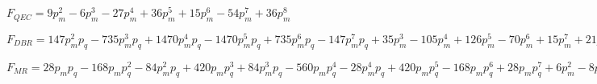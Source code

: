 $F_{QEC} = 9p_{m}^{2} - 6p_{m}^{3} - 27p_{m}^{4} + 36p_{m}^{5} + 15p_{m}^{6} - 54p_{m}^{7} + 36p_{m}^{8}$

$F_{DBR} = 147p_{m}^{2}p_{q} - 735p_{m}^{3}p_{q} + 1470p_{m}^{4}p_{q} - 1470p_{m}^{5}p_{q} + 735p_{m}^{6}p_{q} - 147p_{m}^{7}p_{q} + 35p_{m}^{3} - 105p_{m}^{4} + 126p_{m}^{5} - 70p_{m}^{6} + 15p_{m}^{7} + 21p_{q}^{2} - 70p_{q}^{3} + 105p_{q}^{4} - 84p_{q}^{5} + 35p_{q}^{6} - 6p_{q}^{7} - 882p_{m}^{2}p_{q}^{2} + 2205p_{m}^{2}p_{q}^{3} + 3675p_{m}^{3}p_{q}^{2} - 2940p_{m}^{2}p_{q}^{4} - 8575p_{m}^{3}p_{q}^{3} - 6615p_{m}^{4}p_{q}^{2} + 2205p_{m}^{2}p_{q}^{5} + 11025p_{m}^{3}p_{q}^{4} + 14700p_{m}^{4}p_{q}^{3} + 6174p_{m}^{5}p_{q}^{2} - 882p_{m}^{2}p_{q}^{6} - 8085p_{m}^{3}p_{q}^{5} - 18375p_{m}^{4}p_{q}^{4} - 13230p_{m}^{5}p_{q}^{3} - 2940p_{m}^{6}p_{q}^{2} + 147p_{m}^{2}p_{q}^{7}  3185p_{m}^{3}p_{q}^{6} + 13230p_{m}^{4}p_{q}^{5}  16170p_{m}^{5}p_{q}^{4} + 6125p_{m}^{6}p_{q}^{3}  567p_{m}^{7}p_{q}^{2} - 525p_{m}^{3}p_{q}^{7}  5145p_{m}^{4}p_{q}^{6}  11466p_{m}^{5}p_{q}^{5}$

$F_{MR} = 28p_{m}p_{q} - 168p_{m}p_{q}^{2} - 84p_{m}^{2}p_{q} + 420p_{m}p_{q}^{3} + 84p_{m}^{3}p_{q} - 560p_{m}p_{q}^{4} - 28p_{m}^{4}p_{q} + 420p_{m}p_{q}^{5} - 168p_{m}p_{q}^{6} + 28p_{m}p_{q}^{7} + 6p_{m}^{2} - 8p_{m}^{3} + 3p_{m}^{4} + 21p_{q}^{2} - 70p_{q}^{3} + 105p_{q}^{4} - 84p_{q}^{5} + 35p_{q}^{6} - 6p_{q}^{7} + 378p_{m}^{2}p_{q}^{2} - 840p_{m}^{2}p_{q}^{3} - 336p_{m}^{3}p_{q}^{2} + 1050p_{m}^{2}p_{q}^{4} + 700p_{m}^{3}p_{q}^{3} + 105p_{m}^{4}p_{q}^{2} - 756p_{m}^{2}p_{q}^{5} - 840p_{m}^{3}p_{q}^{4} - 210p_{m}^{4}p_{q}^{3} + 294p_{m}^{2}p_{q}^{6} + 588p_{m}^{3}p_{q}^{5} + 245p_{m}^{4}p_{q}^{4} - 48p_{m}^{2}p_{q}^{7}  224p_{m}^{3}p_{q}^{6}$


